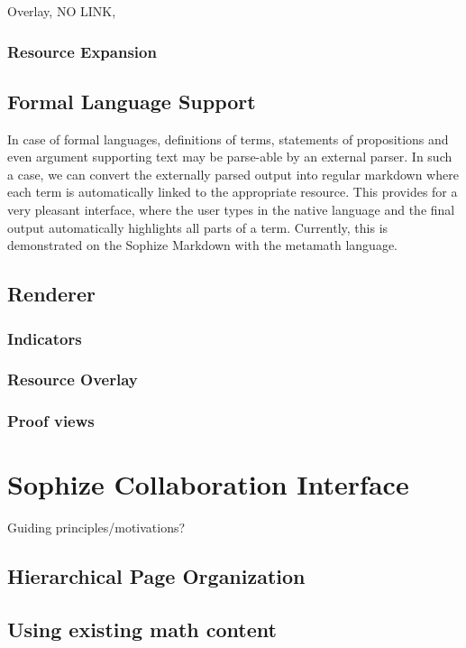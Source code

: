 \documentclass[a4paper]{article}
\begin{document}
Overlay, NO LINK, 

\subsubsection{Resource Expansion}

\subsection{Formal Language Support}
In case of formal languages, definitions of terms, statements of propositions and even argument supporting text may be parse-able by an external parser. In such a case, we can convert the externally parsed output into regular markdown where each term is automatically linked to the appropriate resource. This provides for a very pleasant interface, where the user types in the native language and the final output automatically highlights all parts of a term. Currently, this is demonstrated on the Sophize Markdown with the metamath language.

\subsection{Renderer}

\subsubsection{ Indicators }
\subsubsection{ Resource Overlay }
\subsubsection{ Proof views }

\section{Sophize Collaboration Interface}
Guiding principles/motivations?
\subsection{Hierarchical Page Organization}

\subsection{Using existing math content}
\end{document}
